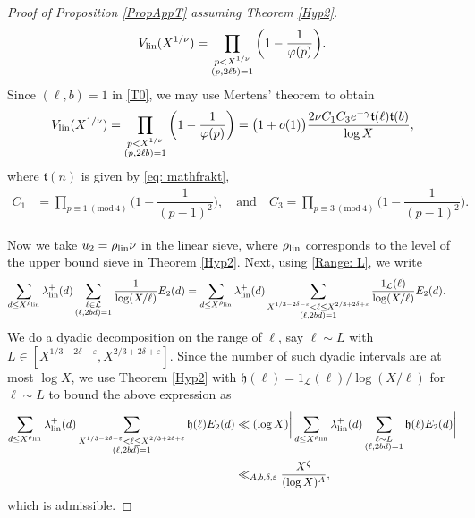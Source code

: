 \documentclass[12pt]{amsart}
\numberwithin{equation}{section}
\theoremstyle{remark}
\theoremstyle{definition}
\newcommand{\imod}[1]{\ (\mathrm{mod}\ #1)}
\begin{document}
\begin{proof}[Proof of Proposition \ref{PropAppT} assuming Theorem \ref{Hyp2}]
\begin{align}
\notag V_{\textup{lin}}(X^{1/\nu}) = \prod_{\substack{p< X^{1/\nu}\\ (p, 2\ell b)=1}}\bigg(1-\dfrac{1}{\varphi(p)}\bigg).
\end{align}
Since $(\ell, b)=1$ in \eqref{T0}, we may use Mertens' theorem \cite[Theorem 3.4(c)]{kou} to obtain
\begin{align}
\label{Eq: Vlin} V_{\textup{lin}}(X^{1/\nu}) = \prod_{\substack{p< X^{1/\nu}\\ (p, 2\ell b)=1}}\bigg(1-\dfrac{1}{\varphi(p)}\bigg)=\big(1+o(1)\big)\dfrac{2\nu C_1C_3e^{-\gamma}\mathfrak{t}(\ell)\mathfrak{t}(b)}{\log X},
\end{align}
where $\mathfrak{t}(n)$ is given by \eqref{eq: mathfrakt},
\begin{align}
\label{C_1C_3} C_1 &= \prod_{p\equiv 1 \imod 4}\bigg(1-\dfrac{1}{(p-1)^2}\bigg), \quad \text{and} \quad C_3 = \prod_{p\equiv 3\imod 4}\bigg(1-\dfrac{1}{(p-1)^2}\bigg).
\end{align}

Now we take $u_2=\rho_{\textup{lin}} \nu$ in the linear sieve, where $\rho_{\textup{lin}}$ corresponds to the level of the upper bound sieve in Theorem \ref{Hyp2}. Next, using \eqref{Range: L}, we write 
\begin{align}
\notag \sum_{d\leq X^{\rho_{\textup{lin}}}}\lambda^+_{\textup{lin}}(d)\sum_{\substack{\ell \in \mathcal{L}\\(\ell, 2bd)=1}}\dfrac{1}{\log (X/\ell)}{E}_2(d)&=\sum_{d\leq X^{\rho_{\textup{lin}}}}\lambda^+_{\textup{lin}}(d)\sum_{\substack{X^{1/3-2\delta-\varepsilon}<\ell\leq X^{2/3+2\delta+\varepsilon}\\(\ell, 2bd)=1}}\dfrac{1_{\mathcal{L}}(\ell)}{\log (X/\ell)}{E}_2(d).
\end{align}
We do a dyadic decomposition on the range of $\ell$, say $\ell \sim L$ with $L\in [X^{1/3-2\delta-\varepsilon}, X^{2/3+2\delta+\varepsilon}]$. Since the number of such dyadic intervals are at most $\log X$, we use Theorem \ref{Hyp2} with $\mathfrak{h}(\ell) = 1_{\mathcal{L}}(\ell)/\log (X/\ell)$ for $\ell\sim L$ to bound the above expression as
\begin{align}
\notag \sum_{d\leq X^{\rho_{\textup{lin}}}}\lambda^+_{\textup{lin}}(d)\sum_{\substack{X^{1/3-2\delta-\varepsilon}<\ell\leq X^{2/3+2\delta+\varepsilon}\\(\ell, 2bd)=1}}\mathfrak{h}(\ell){E}_2(d)&\ll (\log X)\bigg|\sum_{d\leq X^{\rho_{\textup{lin}}}}\lambda^+_{\textup{lin}}(d)\sum_{\substack{\ell \sim L\\(\ell, 2bd)=1}}\mathfrak{h}(\ell){E}_2(d)\bigg|\\
\notag &\ll_{A, b, \delta, \varepsilon} \dfrac{X^{\zeta}}{(\log X)^A},
\end{align}
which is admissible.


\end{proof}
\end{document}
